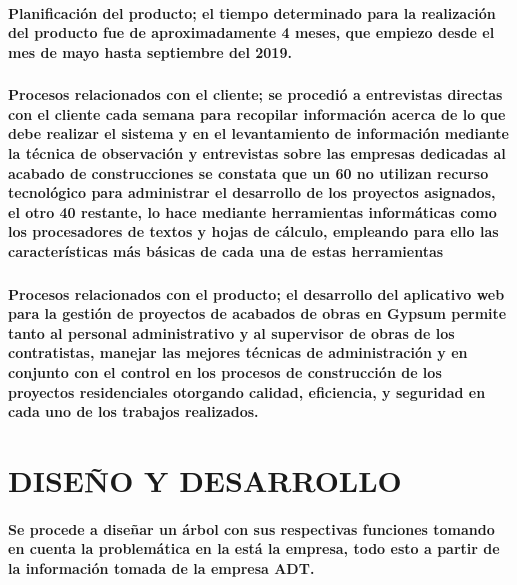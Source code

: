 \documentclass[12pt,a4paper]{article}
\begin{document}
\paragraph{Planificación del producto; el tiempo determinado para la realización del producto fue de aproximadamente 4 meses, que empiezo desde el mes de mayo hasta septiembre del 2019.}
\newpage
\subsubsection{}
\paragraph{Procesos relacionados con el cliente; se procedió a entrevistas directas con el cliente cada semana para recopilar información acerca de lo que debe realizar el sistema y en el levantamiento de información mediante la técnica de observación y entrevistas sobre las empresas dedicadas al acabado de construcciones se constata que un 60 no utilizan recurso tecnológico para administrar el desarrollo de los proyectos asignados, el otro 40 restante, lo hace mediante herramientas informáticas como los procesadores de textos y hojas de cálculo, empleando para ello las características más básicas de cada una de estas herramientas}
\subsubsection{}
\paragraph{Procesos relacionados con el producto; el desarrollo del aplicativo web para la gestión de proyectos de acabados de obras en Gypsum permite tanto al personal administrativo y al supervisor de obras de los contratistas, manejar las mejores técnicas de administración y en conjunto con el control en los procesos de construcción de los proyectos residenciales otorgando calidad, eficiencia, y seguridad en cada uno de los trabajos realizados.}
\section{DISEÑO Y DESARROLLO }
\paragraph{Se procede a diseñar un árbol con sus respectivas funciones tomando en cuenta la problemática en la está la empresa, todo esto a partir de la información tomada de la empresa ADT.}
\end{document}
